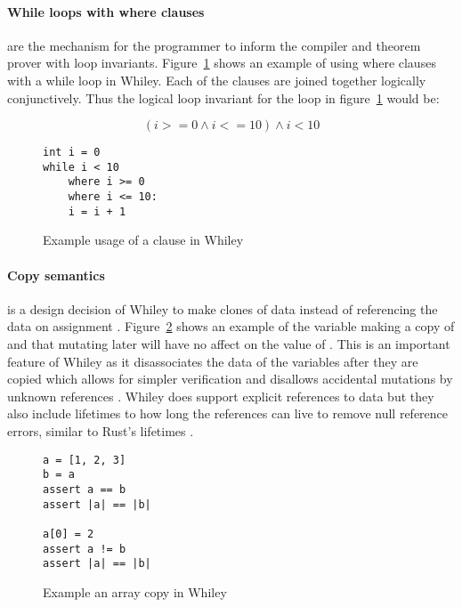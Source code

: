 \paragraph{While loops with where clauses} are the mechanism for the programmer
to inform the compiler and theorem prover with loop invariants.
Figure~\ref{lst:whiley-where} shows an example of using where clauses with a
while loop in Whiley.
Each of the  clauses are joined together logically conjunctively.
Thus the logical loop invariant for the loop in figure~\ref{lst:whiley-where} would be:

$$(i >= 0 \wedge i <= 10) \wedge i < 10$$

\begin{figure}[ht]
\begin{lstlisting}
int i = 0
while i < 10
    where i >= 0
    where i <= 10:
    i = i + 1
\end{lstlisting}
    \label{lst:whiley-where}
    \caption{Example usage of a  clause in Whiley}
\end{figure}

\paragraph{Copy semantics} is a design decision of Whiley to
make clones of data instead of referencing the data on assignment \cite{whiley-arrays}.
Figure~\ref{lst:whiley-array-copy} shows an example of the variable
 making a copy of  and that mutating  later
will have no affect on the value of .
This is an important feature of Whiley as it disassociates the data
of the variables after they are copied which allows for simpler verification
and disallows accidental mutations by unknown references \cite{whiley-array}.
Whiley does support explicit references to data but they also include
lifetimes to how long the references can live to remove null reference errors,
similar to Rust's lifetimes \cite{rust-lang}.

\begin{figure}[ht]
\begin{lstlisting}
a = [1, 2, 3]
b = a
assert a == b
assert |a| == |b|

a[0] = 2
assert a != b
assert |a| == |b|
\end{lstlisting}
    \label{lst:whiley-array-copy}
    \caption{Example an array copy in Whiley}
\end{figure}

